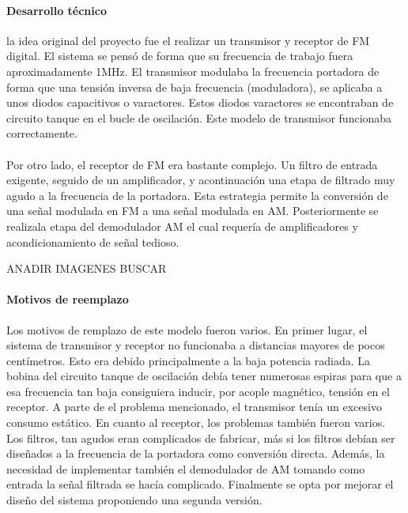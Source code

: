 \paragraph{Desarrollo técnico}
la idea original del proyecto fue el realizar un transmisor y receptor de FM digital. El sistema se pensó de forma que su frecuencia de trabajo fuera aproximadamente 1MHz. 
El transmisor modulaba la frecuencia portadora de forma que una tensión inversa de baja frecuencia (moduladora), se aplicaba a unos diodos capacitivos o varactores. Estos diodos varactores se encontraban de circuito tanque en el bucle de oscilación.
Este modelo de transmisor funcionaba correctamente.

\paragraph{}
Por otro lado, el receptor de FM era bastante complejo. Un filtro de entrada exigente, seguido de un amplificador, y acontinuación una etapa de filtrado muy agudo a la frecuencia de la portadora. Esta estrategia permite la conversión de una señal modulada en FM a una señal modulada en AM. Posteriormente se realizala etapa del demodulador AM el cual requería de amplificadores y acondicionamiento de señal tedioso.  

ANADIR IMAGENES BUSCAR

\paragraph{Motivos de reemplazo}
Los motivos de remplazo de este modelo fueron varios.
En primer lugar, el sistema de transmisor y receptor no funcionaba a distancias mayores de pocos centímetros. Esto era debido principalmente a la baja potencia radiada. La bobina del circuito tanque de oscilación debía tener numerosas espiras para que a esa frecuencia tan baja consiguiera inducir, por acople magnético, tensión en el receptor.
A parte de el problema mencionado, el transmisor tenía un excesivo consumo estático. En cuanto al receptor, los problemas también fueron varios. Los filtros, tan agudos eran complicados de fabricar, más si los filtros debían ser diseñados a la frecuencia de la portadora como conversión directa. Además, la necesidad de implementar también el demodulador de AM tomando como entrada la señal filtrada se hacía complicado.
Finalmente se opta por mejorar el diseño del sistema proponiendo una segunda versión.
